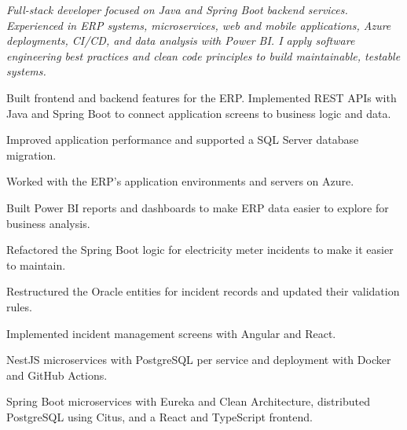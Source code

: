 \documentclass[11pt,english]{article}
\begin{document}

\textit{Full-stack developer focused on Java and Spring Boot backend services. Experienced in ERP systems, microservices, web and mobile applications, Azure deployments, CI/CD, and data analysis with Power BI. I apply software engineering best practices and clean code principles to build maintainable, testable systems.}

\begin{cvList}
  \item Built frontend and backend features for the ERP. Implemented REST APIs with Java and Spring Boot to connect application screens to business logic and data.
  \item Improved application performance and supported a SQL Server database migration.
  \item Worked with the ERP's application environments and servers on Azure.
  \item Built Power BI reports and dashboards to make ERP data easier to explore for business analysis.
\end{cvList}

\begin{cvList}
  \item Refactored the Spring Boot logic for electricity meter incidents to make it easier to maintain.
  \item Restructured the Oracle entities for incident records and updated their validation rules.
  \item Implemented incident management screens with Angular and React.
\end{cvList}

\begin{cvList}
  \item NestJS microservices with PostgreSQL per service and deployment with Docker and GitHub Actions.
\end{cvList}

\begin{cvList}
  \item Spring Boot microservices with Eureka and Clean Architecture, distributed PostgreSQL using Citus, and a React and TypeScript frontend.
\end{cvList}
\end{document}
